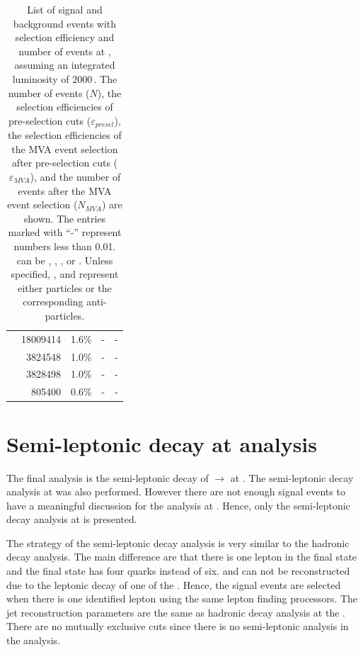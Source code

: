 \begin{table}[!htbp]
\begin{tabular}{lrrrr}
\hline
\gammagamma{\Pphoton}{\BS}{\Pphoton}{\BS}{ \Pquark \Pquark \Pquark \Pquark}& 18009414  & 1.6\%&   - & - \\
\gammagamma{\Pphoton}{\BS}{\Pphoton}{\EPA}{ \Pquark \Pquark \Pquark \Pquark}& 3824548  & 1.0\%&  - & - \\
\gammagamma{\Pphoton}{\EPA}{\Pphoton}{\BS}{ \Pquark \Pquark \Pquark \Pquark}& 3828498& 1.0\%&  - & - \\
\gammagamma{\Pphoton}{\EPA}{\Pphoton}{\EPA}{ \Pquark \Pquark \Pquark \Pquark}& 805400 & 0.6\%&  - & - \\
\hline \hline
\end{tabular}
\caption[List of signal and background selection efficiencies and event numbers after MVA application at  .]
{List of signal and background events with selection efficiency and number of events at , assuming an integrated  luminosity of 2000\,. The number of events ($N$), the selection efficiencies of pre-selection cuts ($\varepsilon_{presel}$), the selection efficiencies of the MVA event selection after pre-selection cuts ($\varepsilon_{MVA}$), and the number of events after the MVA event selection ($N_{MVA}$) are shown. The entries marked with ``-'' represent  numbers less than 0.01. \Pquark can be \Pup, \Pdown, \Pstrange, \Pbottom or \Ptop. Unless specified, \Pquark, \Plepton and \Pnu represent either particles or the corresponding anti-particles.}
\label{tab:doubleHiggs3TeVMVA}
\end{table}

\section{Semi-leptonic decay at  analysis}

The final analysis is the semi-leptonic \WW decay of \eeToHH $\to$ \HepProcess{ \Pbottom \APbottom \PWplus \PWminus \Pnu \APnu}  at . The semi-leptonic decay analysis at  was also performed. However there are not enough signal events to have a meaningful discussion for the analysis at . Hence, only the semi-leptonic decay analysis at  is presented.

The strategy of the semi-leptonic decay  analysis is very similar to the hadronic decay analysis. The main difference are that there is one lepton in the final state and the final state has four quarks instead of six. \Hbb and \PW can not be reconstructed due to the leptonic decay of one of the \PW. Hence, the signal events are selected when there is one identified lepton using the same lepton finding processors. The jet reconstruction parameters are the same as hadronic decay analysis at the . There are no mutually exclusive cuts since there is no semi-leptonic analysis in the \eeToHHbbbb analysis.

